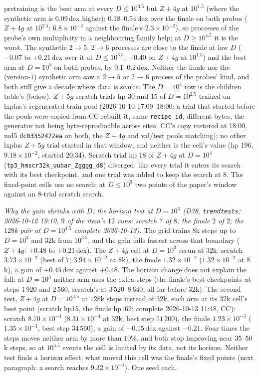 \documentclass[11pt]{article}
\newcommand{\code}[1]{\texttt{#1}}
\begin{document}
pretraining is the best arm at every $D\le10^{3.5}$ but $Z+4g$ at $10^{1.5}$ (where the synthetic arm is $0.09$\,dex
higher): $0.18$--$0.54$\,dex over the finale on both probes ($Z+4g$ at $10^{2.5}$: $6.8\times10^{-3}$ against the finale's $2.3\times10^{-2}$), so processes of the probe's own
multiplicity in a neighbouring family help; at $D\ge10^{4.5}$ it is the worst. The synthetic $2\to5$, $2\to6$ processes
are close to the finale at low $D$ ($-0.07$ to $+0.21$\,dex over it at $D\le10^{3.5}$, $+0.40$ on $Z+4g$ at $10^{1.5}$) and the best arm at
$D=10^5$ on both probes, by $0.1$--$0.2$\,dex. Neither the finale nor the (version-$1$) synthetic arm saw a $2\to5$ or $2\to6$
process of the probes' kind, and both still give a decade where data is scarce. The $D=10^4$ row is the children
table's (below). $Z+5g$ scratch trials hp 30 and 15 of $D=10^{2.5}$ trained on lxplus's regenerated train pool (2026-10-10
17:09--18:00: a trial that started before the pools were copied from CC rebuilt it, same \code{recipe\_id},
different bytes, the generator not being byte-reproducible across sites; CC's copy restored at 18:00, md5
\code{dc03352472ea} on both, the $Z+4g$ and val/test pools matching); no other lxplus $Z+5g$ trial started in that window, and neither is the cell's value (hp 196,
$9.18\times10^{-2}$, started 20:34). Scratch trial hp 18 of $Z+4g$ at $D=10^4$
(\code{tp3\_hmscr32k\_uubar\_Zgggg\_d8}) diverged; like every trial it enters its search with its best checkpoint, and one
trial was added to keep the search at $8$. The
fixed-point cells use no search; at $D\le10^{3}$ two points of the paper's window against an $8$-trial scratch search.

\emph{Why the gain shrinks with $D$: the horizon test at $D=10^3$ (D38, \code{trendtests}; 2026-10-12 19:10, $9$ of the
item's $12$ runs: scratch $7$ of $8$, the finale $2$ of $2$; the $128$k pair at $D=10^{4.5}$ complete 2026-10-13).} The grid
trains $8$k steps up to $D=10^3$ and $32$k from $10^{3.5}$, and the gain falls fastest across that boundary
($Z+4g$: $+0.48$ to $+0.21$\,dex). The $Z+4g$ cell at $D=10^3$ rerun at $32$k: scratch $3.73\times10^{-2}$ (best of
$7$; $3.94\times10^{-2}$ at $8$k), the finale $1.32\times10^{-2}$ ($1.32\times10^{-2}$ at $8$k), a gain of $+0.45$\,dex
against $+0.48$. The horizon change does not explain the fall: at $D=10^3$ neither arm uses the extra steps (the
finale's best checkpoints at steps $1\,920$ and $2\,560$, scratch's at $3\,520$--$8\,640$, all far before $32$k).
The second test, $Z+4g$ at $D=10^{4.5}$ at $128$k steps instead of $32$k, each arm at its $32$k cell's best point
(scratch hp15, the finale hp162; complete 2026-10-13 11:48, CC): scratch $8.70\times10^{-4}$ ($8.31\times10^{-4}$ at
$32$k, best step $51\,200$), the finale $1.23\times10^{-3}$ ($1.35\times10^{-3}$, best step $34\,560$), a gain of
$-0.15$\,dex against $-0.21$. Four times the steps moves neither arm by more than $10\%$, and both stop improving
near $35$--$50$k steps, so at $10^{4.5}$ events the cell is limited by its data, not its horizon. Neither test finds
a horizon effect; what moved this cell was the finale's fixed points (next paragraph: a search reaches
$9.32\times10^{-4}$). One seed each.
\end{document}
